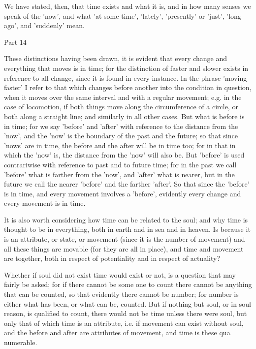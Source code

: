 We have stated, then, that time exists and what it is, and in how
many senses we speak of the 'now', and what 'at some time', 'lately',
'presently' or 'just', 'long ago', and 'suddenly' mean. 

Part 14

These distinctions having been drawn, it is evident that every change
and everything that moves is in time; for the distinction of faster
and slower exists in reference to all change, since it is found in
every instance. In the phrase 'moving faster' I refer to that which
changes before another into the condition in question, when it moves
over the same interval and with a regular movement; e.g. in the case
of locomotion, if both things move along the circumference of a circle,
or both along a straight line; and similarly in all other cases. But
what is before is in time; for we say 'before' and 'after' with reference
to the distance from the 'now', and the 'now' is the boundary of the
past and the future; so that since 'nows' are in time, the before
and the after will be in time too; for in that in which the 'now'
is, the distance from the 'now' will also be. But 'before' is used
contrariwise with reference to past and to future time; for in the
past we call 'before' what is farther from the 'now', and 'after'
what is nearer, but in the future we call the nearer 'before' and
the farther 'after'. So that since the 'before' is in time, and every
movement involves a 'before', evidently every change and every movement
is in time. 

It is also worth considering how time can be related to the soul;
and why time is thought to be in everything, both in earth and in
sea and in heaven. Is because it is an attribute, or state, or movement
(since it is the number of movement) and all these things are movable
(for they are all in place), and time and movement are together, both
in respect of potentiality and in respect of actuality? 

Whether if soul did not exist time would exist or not, is a question
that may fairly be asked; for if there cannot be some one to count
there cannot be anything that can be counted, so that evidently there
cannot be number; for number is either what has been, or what can
be, counted. But if nothing but soul, or in soul reason, is qualified
to count, there would not be time unless there were soul, but only
that of which time is an attribute, i.e. if movement can exist without
soul, and the before and after are attributes of movement, and time
is these qua numerable. 

